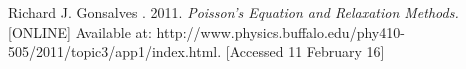 \documentclass{article}
\begin{document}
%		
%	
%		
%	
%		
%	
%		
%	
%		
%	
%		
%	
%		
%	
%		
%	
%		
%	
%		
%	
%		
%	
%		
%	
%		
%	
%		
%	
%		
%	
%		
%	
%		
%	
%		
%	
%		
%	
%		
%	
%		
%	
%		
%	
%		
%	
%		
%	
%		
%	
%		
%	
%		
%	
%		
%	
%		
%	
%		
%	
%		
%	
%		
%	
%		
%	
%		
%	
%		
%	
%		
%	
%		
%	
%		
%	
%		
%	
%		
%	
%		
%	
%		
%	
%		
%	
%		
%	
%		
%	
%		
%	
%		
%	
%		
%	
%		
%	
%		
%	
%		
%	
%		
%	
%		
%	
%		
%	
%		
%	
	\begin{thebibliography}{9}
	Richard J. Gonsalves . 2011. \textit{Poisson's Equation and Relaxation Methods.} [ONLINE] Available at: http://www.physics.buffalo.edu/phy410-505/2011/topic3/app1/index.html. [Accessed 11 February 16]
	\end{thebibliography}
	
\end{document}
